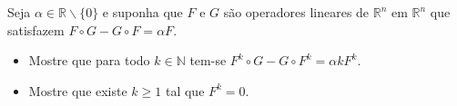 Seja \(\alpha\in\mathbb R\backslash \{ 0 \}\) e suponha que \(F\) e \(G\) são operadores lineares de \(\mathbb R^n\) em \(\mathbb R^n\) que satisfazem \(F\circ G - G\circ F=\alpha F\).
\begin{itemize}

\item[(a)] Mostre que para todo \(k\in\mathbb N\) tem-se \(F^k\circ G-G\circ F^k=\alpha kF^k\).

\item[(b)] Mostre que existe \(k\geq 1\) tal que \(F^k=0\).
\end{itemize}
